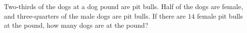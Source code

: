 Two-thirds of the dogs at a dog pound are pit bulls. Half of the dogs are female, and three-quarters of the male dogs are pit bulls. If there are $14$ female pit bulls at the pound, how many dogs are at the pound?
